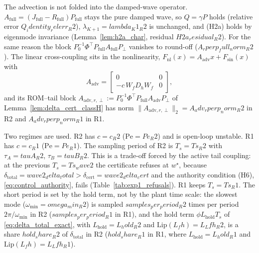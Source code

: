 The advection is not folded into the damped-wave operator. \(A_{\mathrm{full}} = (J_{\mathrm{full}} - R_{\mathrm{full}})P_{\mathrm{full}}\)
stays the pure damped wave, so \(Q = \gamma P\) holds (relative error \({{Q_identity_relerr_R2}}\)), \(\lambda_{K+1} = {{lambda_K1_R2}}\)
is unchanged, and (H2a) holds by eigenmode invariance (Lemma~\ref{lem:h2a_char}, residual \({{H2a_residual_R2}}\)). For
the same reason the block \(P_0^{-1}\Phi^\top P_{\mathrm{full}}A_{\mathrm{full}}P_\perp\) vanishes to round-off
(\({{A_rperp_full_norm_R2}}\)). The linear cross-coupling sits in the nonlinearity,
\(F_{\mathrm{nl}}(x) = A_{\mathrm{adv}}x + F_{\sin}(x)\) with
\[
A_{\mathrm{adv}} = \begin{bmatrix}0&0\\-c\,W_fD_hW_f&0\end{bmatrix},
\]
and its ROM--tail block \(A_{\mathrm{adv},r,\perp} := P_0^{-1}\Phi^\top P_{\mathrm{full}}A_{\mathrm{adv}}P_\perp\) of
Lemma~\ref{lem:delta_cert_classH} has norm \(\|A_{\mathrm{adv},r,\perp}\|_2 = {{A_adv_rperp_norm_R2}}\) in R2 and
\({{A_adv_rperp_norm_R1}}\) in R1.

Two regimes are used. R2 has \(c = {{c_R2}}\) (\(\mathrm{Pe} = {{Pe_R2}}\)) and is open-loop unstable. R1 has
\(c = {{c_R1}}\) (\(\mathrm{Pe} = {{Pe_R1}}\)). The sampling period of R2 is \(T_s = {{Ts_R2}}\) with
\(\tau_A = {{tauA_R2}}\), \(\tau_B = {{tauB_R2}}\). This is a trade-off forced by the active tail coupling: at the
previous \(T_s = {{Ts_wave2}}\) the certificate refuses at \(w^\star\), because
\(\delta_{\mathrm{total}} = {{wave2_delta_total}} > \delta_{\mathrm{cert}} = {{wave2_delta_cert}}\) and
the authority condition (H6), \eqref{eq:control_authority}, fails (Table~\ref{tab:exp1_refusals}). R1 keeps \(T_s = {{Ts_R1}}\).
The short period is set by the hold term, not by the plant time scale: the slowest mode (\(\omega_{\min} = {{omega_min_R2}}\))
is sampled \({{samples_per_period_R2}}\) times per period \(2\pi/\omega_{\min}\) in R2 (\({{samples_per_period_R1}}\) in R1),
and the hold term \(\phi L_{\mathrm{hold}}T_s\) of \eqref{eq:delta_total_exact}, with \(L_{\mathrm{hold}} = {{L_hold_R2}}\)
and \(\mathrm{Lip}(L_fh) = {{L_Lfh_R2}}\), is a share \({{hold_share_R2}}\) of \(\delta_{\mathrm{total}}\) in R2
(\({{hold_share_R1}}\) in R1, where \(L_{\mathrm{hold}} = {{L_hold_R1}}\) and \(\mathrm{Lip}(L_fh) = {{L_Lfh_R1}}\)).

